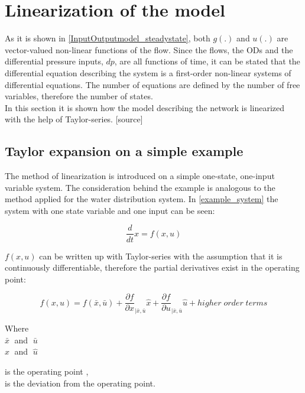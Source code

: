 \section{Linearization of the model} 
\label{LinParamEst}

As it is shown in \eqref{InputOutputmodel_steadystate}, both $g(.)$ and $u(.)$ are vector-valued non-linear functions of the flow. Since the flows, the ODs and the differential pressure inputs, $dp$, are all functions of time, it can be stated that the differential equation describing the system is a first-order non-linear systems of differential equations. The number of equations are defined by the number of free variables, therefore the number of states.
\\
In this section it is shown how the model describing the network is linearized with the help of Taylor-series. [source] 

\subsection{Taylor expansion on a simple example}
 \label{Taylorexamplesection}

The method of linearization is introduced on a simple one-state, one-input variable system. The consideration behind the example is analogous to the method applied for the water distribution system. In \eqref{example_system} the system with one state variable and one input can be seen: 

\begin{equation}
\frac{d}{dt} x = f(x,u)
 \label{example_system}
\end{equation}

$f(x,u)$ can be written up with Taylor-series with the assumption that it is continuously differentiable, therefore the partial derivatives exist in the operating point: 

\begin{equation}
f(x,u) = f(\bar{x},\bar{u}) + \frac{\partial f}{\partial x}_{|\bar{x}, \bar{u}} \hat{x} + \frac{\partial f}{\partial u}_{|\bar{x}, \bar{u}} \hat{u} + higher \; order \; terms  
 \label{TaylorExpansion}
\end{equation}

\begin{minipage}[t]{0.20\textwidth}
Where\\
\hspace*{8mm} $\bar{x} \;$ and $\; \bar{u}$ \\
\hspace*{8mm} $\hat{x} \;$ and $\; \hat{u}$ 
\end{minipage}
\begin{minipage}[t]{0.68\textwidth}
\vspace*{2mm}
is the operating point ,\\
is the deviation from the operating point.
\end{minipage}

